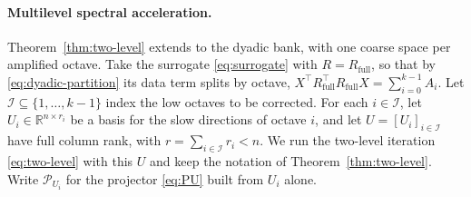 \documentclass{article}
\newcommand{\R}{\mathbb{R}}
\begin{document}
\paragraph{Multilevel spectral acceleration.}
Theorem~\ref{thm:two-level} extends to the dyadic bank, with one coarse space per amplified octave. Take the surrogate \eqref{eq:surrogate} with $R=R_{\mathrm{full}}$, so that by \eqref{eq:dyadic-partition} its data term splits by octave, $X^\top R_{\mathrm{full}}^\top R_{\mathrm{full}}X=\sum_{i=0}^{k-1}A_i$. Let $\mathcal I\subseteq\{1,\dots,k-1\}$ index the low octaves to be corrected. For each $i\in\mathcal I$, let $U_i\in\R^{n\times r_i}$ be a basis for the slow directions of octave $i$, and let $U=[U_i]_{i\in\mathcal I}$ have full column rank, with $r=\sum_{i\in\mathcal I}r_i<n$. We run the two-level iteration \eqref{eq:two-level} with this $U$ and keep the notation of Theorem~\ref{thm:two-level}. Write $\mathcal P_{U_i}$ for the projector \eqref{eq:PU} built from $U_i$ alone.
\end{document}
